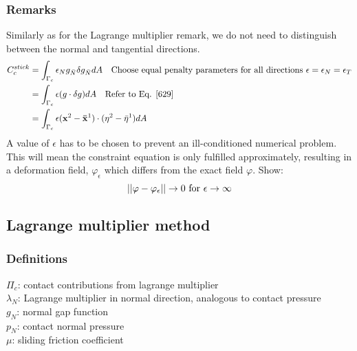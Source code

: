 \documentclass[12pt,3p]{article}
\numberwithin{equation}{section}
\begin{document}
\subsubsection{Remarks}
Similarly as for the Lagrange multiplier remark, we do not need to distinguish between the normal and tangential directions. 
\begin{align}
\begin{split}
C_c^{stick} &= \int_{\Gamma_c} \epsilon_N g_{\bar{N}} \delta g_{\bar{N}} dA \quad \text{Choose equal penalty parameters for all directions } \epsilon = \epsilon_N = \epsilon_T \\
		  &= \int_{\Gamma_c} \epsilon (g \cdot \delta g) dA \quad \text{Refer to Eq. \ref{629}} \\
		  &= \int_{\Gamma_c} \epsilon (\mathbf{x}^2 - \mathbf{\bar{x}}^1) \cdot (\eta^2 - \bar{\eta}^1) dA
\end{split}
\end{align}
A value of $\epsilon$ has to be chosen to prevent an ill-conditioned numerical problem. This will mean the constraint equation is only fulfilled approximately, resulting in a deformation field, $\varphi_\epsilon$ which differs from the exact field $\varphi$. Show:
\begin{equation*}
\abs{\abs{\varphi - \varphi_\epsilon}} \rightarrow 0 \text{ for } \epsilon \rightarrow \infty
\end{equation*}

\subsection{Lagrange multiplier method}
\subsubsection{Definitions}
$\Pi_c$: contact contributions from lagrange multiplier \\
$\lambda_N$: Lagrange multiplier in normal direction, analogous to contact pressure \\
$g_N$: normal gap function \\
$p_N$: contact normal pressure \\
$\mu$: sliding friction coefficient \\
\end{document}
